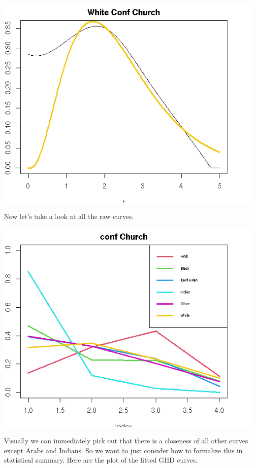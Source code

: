 \documentclass{amsart}
\begin{document}
\includegraphics[scale=0.8]{cfchurch_white.png}

Now let's take a look at all the raw curves.

\includegraphics[scale=0.8]{cfchurch_raw.png}

Visually we can immediately pick out that there is a closeness of all other curves except Arabs and Indians.  So we want to just consider how to formalize this in statistical summary.  Here are the plot of the fitted GHD curves.
\end{document}
